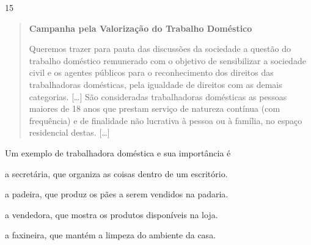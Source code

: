 
\num{15}

\begin{quote}
\textbf{Campanha pela Valorização do Trabalho Doméstico}

Queremos trazer para pauta das discussões da sociedade a questão do
trabalho doméstico remunerado com o objetivo de sensibilizar a sociedade
civil e os agentes públicos para o reconhecimento dos direitos das
trabalhadoras domésticas, pela igualdade de direitos com as demais
categorias. {[}\ldots{}{]}
São consideradas trabalhadoras domésticas as pessoas maiores
de 18 anos que prestam serviço de natureza contínua (com frequência) e
de finalidade não lucrativa à pessoa ou à família, no espaço residencial
destas. {[}\ldots{}{]}

\end{quote}

\noindent{}Um exemplo de trabalhadora doméstica e sua importância é

\begin{escolha}
\item a secretária, que organiza as coisas dentro de um escritório.

\item a padeira, que produz os pães a serem vendidos na padaria.

\item a vendedora, que mostra os produtos disponíveis na loja.

\item a faxineira, que mantém a limpeza do ambiente da casa.
\end{escolha}



\pagebreak